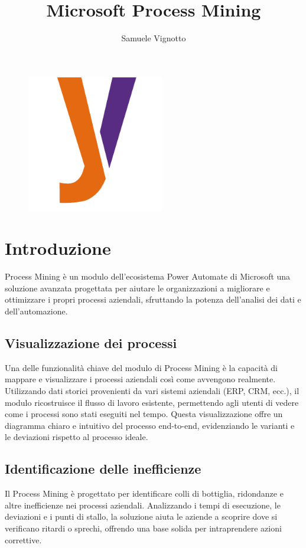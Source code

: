 \documentclass{article}
\title{\Huge{\textbf{Microsoft Process Mining}}\vspace{-1em}}
\author{Samuele Vignotto}
\date{}
\begin{document}
\maketitle
\begin{figure}[h]
  \centering
  \includegraphics[width=6cm, height=6cm]{Logo/Y_LOGO-SOLO.png}
  \label{fig:immagine}
\end{figure}

\newpage
\tableofcontents
\newpage

\section{Introduzione}
Process Mining è un modulo dell'ecosistema Power Automate di Microsoft una soluzione avanzata progettata per aiutare le organizzazioni a migliorare e ottimizzare i propri processi aziendali, sfruttando la potenza dell'analisi dei dati e dell'automazione.

\subsection{Visualizzazione dei processi}
Una delle funzionalità chiave del modulo di Process Mining è la capacità di mappare e visualizzare i processi aziendali così come avvengono realmente. Utilizzando dati storici provenienti da vari sistemi aziendali (ERP, CRM, ecc.), il modulo ricostruisce il flusso di lavoro esistente, permettendo agli utenti di vedere come i processi sono stati eseguiti nel tempo. Questa visualizzazione offre un diagramma chiaro e intuitivo del processo end-to-end, evidenziando le varianti e le deviazioni rispetto al processo ideale.

\subsection{Identificazione delle inefficienze}
Il Process Mining è progettato per identificare colli di bottiglia, ridondanze e altre inefficienze nei processi aziendali. Analizzando i tempi di esecuzione, le deviazioni e i punti di stallo, la soluzione aiuta le aziende a scoprire dove si verificano ritardi o sprechi, offrendo una base solida per intraprendere azioni correttive.
\end{document}

